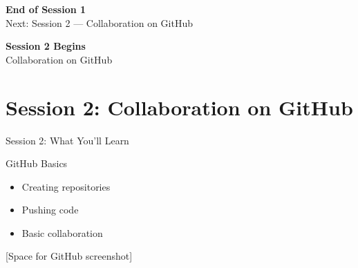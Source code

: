 \documentclass[aspectratio=169]{beamer}
\begin{document}
\begin{frame}
  \centering
  \Huge{\textbf{End of Session 1}}\\[0.5em]
  \large{Next: Session 2 — Collaboration on GitHub}
\end{frame}

\begin{frame}
  \centering
  \Huge{\textbf{Session 2 Begins}}\\[0.5em]
  \large{Collaboration on GitHub}
\end{frame}

\section{Session 2: Collaboration on GitHub}
\begin{frame}{Session 2: What You'll Learn}
      \begin{block}{GitHub Basics}
        \begin{itemize}
          \item Creating repositories
          \item Pushing code
          \item Basic collaboration
        \end{itemize}
      \end{block}
      
      \begin{center}
        [Space for GitHub screenshot]
      \end{center}
\end{frame}
\end{document}
